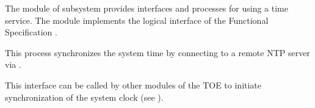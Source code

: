 



The module  of subsystem 
provides interfaces and processes for using a time service. The module
implements the logical interface  of the Functional
Specification \autocite[Section~3.2.6]{adv_fsp}.



This process synchronizes the system time by connecting to a remote NTP server
via .




This interface can be called by other modules of the TOE to initiate
synchronization of the system clock (see ).







